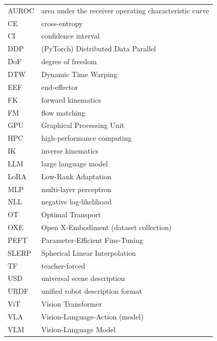 \documentclass[english,12pt,a4paper,pdftex,elec,utf8]{aaltothesis}
\begin{document}
\begin{tabular}{ll}
AUROC      & area under the receiver operating characteristic curve \\
CE         & cross-entropy \\
CI         & confidence interval \\
DDP        & (PyTorch) Distributed Data Parallel \\
DoF        & degree of freedom \\
DTW        & Dynamic Time Warping \\
EEF        & end-effector \\
FK         & forward kinematics \\
FM         & flow matching \\
GPU        & Graphical Processing Unit \\
HPC        & high-performance computing \\
IK         & inverse kinematics \\
LLM        & large language model \\
LoRA       & Low-Rank Adaptation \\
MLP        & multi-layer perceptron \\
NLL        & negative log-likelihood \\
OT         & Optimal Transport \\
OXE        & Open X-Embodiment (dataset collection) \\
PEFT       & Parameter-Efficient Fine-Tuning \\
SLERP      & Spherical Linear Interpolation \\
TF         & teacher-forced \\
USD        & universal scene description \\
URDF       & unified robot description format \\
ViT        & Vision Transformer \\
VLA        & Vision-Language-Action (model) \\
VLM        & Vision-Language Model \\


\end{tabular}


\cleardoublepage
\storeinipagenumber
{}
\setcounter{page}{1}
\end{document}
